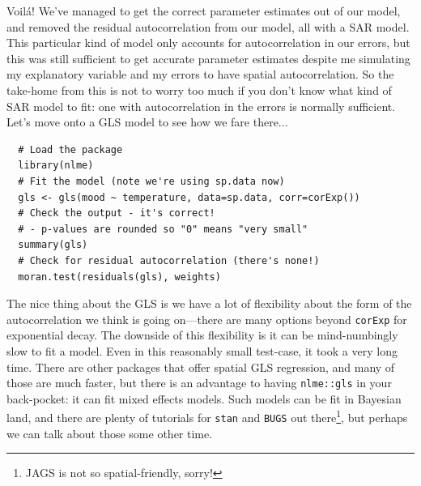 Voil\'{a}! We've managed to get the correct parameter estimates out of
our model, and removed the residual autocorrelation from our model,
all with a SAR model. This particular kind of model only accounts for
autocorrelation in our errors, but this was still sufficient to get
accurate parameter estimates despite me simulating my explanatory
variable and my errors to have spatial autocorrelation. So the
take-home from this is not to worry too much if you don't know what
kind of SAR model to fit: one with autocorrelation in the errors is
normally sufficient. Let's move onto a GLS model to see how we fare
there...

\begin{verbatim}
  # Load the package
  library(nlme)
  # Fit the model (note we're using sp.data now)
  gls <- gls(mood ~ temperature, data=sp.data, corr=corExp())
  # Check the output - it's correct!
  # - p-values are rounded so "0" means "very small"
  summary(gls)
  # Check for residual autocorrelation (there's none!)
  moran.test(residuals(gls), weights)
\end{verbatim}

The nice thing about the GLS is we have a lot of flexibility about the
form of the autocorrelation we think is going on---there are many
options beyond \texttt{corExp} for exponential decay. The downside of
this flexibility is it can be mind-numbingly slow to fit a model. Even
in this reasonably small test-case, it took a very long time. There
are other packages that offer spatial GLS regression, and many of
those are much faster, but there is an advantage to having
\texttt{nlme::gls} in your back-pocket: it can fit mixed effects
models. Such models can be fit in Bayesian land, and there are plenty
of tutorials for \texttt{stan} and \texttt{BUGS} out
there\footnote{JAGS is not so spatial-friendly, sorry!}, but perhaps
we can talk about those some other time.

